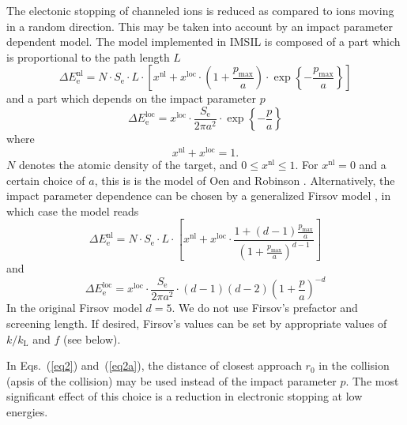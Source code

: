 The electonic stopping of channeled ions is reduced as compared to ions 
moving in a random direction. This may be taken into account by an impact 
parameter dependent model. The model implemented in IMSIL is composed of a part
which is proportional to the path length $L$
%
\begin{equation}
   \Delta E_\mathrm{e}^\mathrm{nl} = 
      N \cdot S_\mathrm{e} \cdot L \cdot
      \left[ x^\mathrm{nl} + x^\mathrm{loc} \cdot 
      \left( 1 + \frac{p_\mathrm{max}}{a} \right)
             \cdot \exp \left\{ - \frac{p_\mathrm{max}}{a} \right\} \right]
   \label{eq1}
\end{equation}
%
and a part which depends on the impact parameter $p$ 
%
\begin{equation}
   \Delta E_\mathrm{e}^\mathrm{loc} = 
      x^\mathrm{loc} \cdot \frac{S_\mathrm{e}}{2 \pi a^2} \cdot
      \exp \left\{ - \frac{p}{a} \right\}
   \label{eq2}
\end{equation}
%
where
%
\begin{equation}
    x^\mathrm{nl} + x^\mathrm{loc} = 1 .
\end{equation}
%
$N$ denotes the atomic density of the target, and $0 \le x^\mathrm{nl} \le 1$. 
For $x^\mathrm{nl} = 0$ and a certain choice of $a$, this is is the model of 
Oen and Robinson \cite{I7607}. 
Alternatively, the impact parameter dependence can be chosen by a generalized 
Firsov model \cite{I5901}, in which case the model reads
%
\begin{equation}
   \Delta E_\mathrm{e}^\mathrm{nl} = 
      N \cdot S_\mathrm{e} \cdot L \cdot
      \left[ x^\mathrm{nl} + x^\mathrm{loc} \cdot \frac{
      1 + (d-1) \frac{p_\mathrm{max}}{a}}{
      \left( 1 + \frac{p_\mathrm{max}}{a} \right) ^ {d-1}} \right]
   \label{eq1a}
\end{equation}
%
and
%
\begin{equation}
   \Delta E_\mathrm{e}^\mathrm{loc} = 
      x^\mathrm{loc} \cdot \frac{S_\mathrm{e}}{2 \pi a^2} \cdot
      (d-1) (d-2) \left( 1 + \frac{p}{a} \right) ^ {-d}
   \label{eq2a}
\end{equation}
%
In the original Firsov model $d=5$. We do not use Firsov's prefactor and
screening length. If desired, Firsov's values can be set by appropriate values
of $k/k_\mathrm{L}$ and $f$ (see below).

In Eqs.~(\ref{eq2}) and~(\ref{eq2a}), the distance of closest approach $r_0$ 
in the collision (apsis of the collision) may be used instead of the impact
parameter $p$. The most significant effect of this choice is a reduction in
electronic stopping at low energies.

